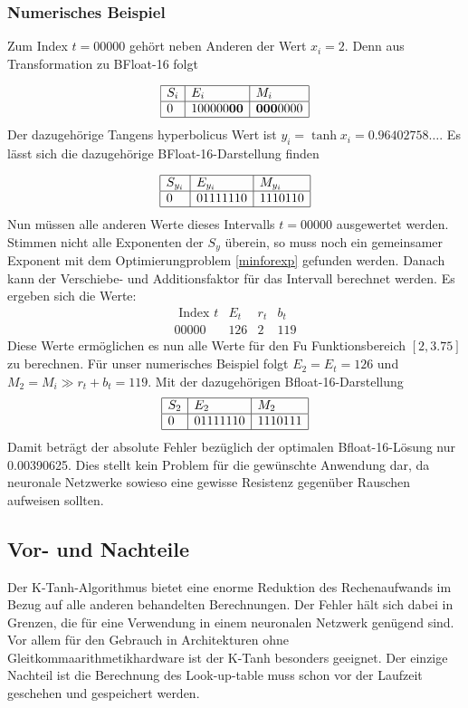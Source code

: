 \subsubsection{Numerisches Beispiel
	\label{transfer:subsection:Ktanh-Algorithmus:Num}}
Zum Index $t = 00000$ gehört neben Anderen der Wert $x_i = 2$. Denn aus Transformation zu BFloat-16 folgt

$$
\begin{array}{|l|l|l|}
	\hline S_i & E_{i} & M_{i} \\
	\hline 0 & 100000 \textbf{00} & \textbf{000} 0000 \\
	\hline
\end{array}
$$
Der dazugehörige Tangens hyperbolicus Wert ist
$y_i = \tanh{x_i}=0.96402758\ldots$. Es lässt sich die dazugehörige BFloat-16-Darstellung finden

$$
\begin{array}{|l|l|l|}
	\hline S_{y_{i}} & E_{y_{i}} & M_{y_{i}} \\
	\hline 0 & 01111110 & 1110110 \\
	\hline
\end{array}
$$
Nun müssen alle anderen Werte dieses Intervalls $t = 00000$ ausgewertet werden. Stimmen nicht alle Exponenten der $S_{y}$ überein, so muss noch ein gemeinsamer Exponent mit dem Optimierungproblem \ref{minforexp} gefunden werden. Danach kann der Verschiebe- und Additionsfaktor für das Intervall berechnet werden. 
Es ergeben sich die Werte:
$$
\begin{array}{c|ccc}
	\text { Index } t & E_{t} & r_{t} & b_{t} \\
	\hline 00000 & 126 & 2 & 119
\end{array}
$$
Diese Werte ermöglichen es nun alle Werte für den Fu Funktionsbereich $[2,3.75]$ zu berechnen. Für unser numerisches Beispiel folgt $E_2 = E_t = 126$ und $M_2 = M_i \gg r_t + b_t = 119$. Mit der dazugehörigen Bfloat-16-Darstellung
$$
\begin{array}{|l|l|l|}
	\hline S_{2} & E_{2} & M_{2} \\
	\hline 0 & 01111110 & 1110111 \\
	\hline
\end{array}
$$
Damit beträgt der absolute Fehler bezüglich der optimalen Bfloat-16-Lösung nur 0.00390625. Dies stellt kein Problem für die gewünschte Anwendung dar, da neuronale Netzwerke sowieso eine gewisse Resistenz gegenüber Rauschen aufweisen sollten.


\subsection{Vor- und Nachteile}
Der K-Tanh-Algorithmus bietet eine enorme Reduktion des Rechenaufwands im Bezug auf alle anderen behandelten Berechnungen. Der Fehler hält sich dabei in Grenzen, die für eine Verwendung in einem neuronalen Netzwerk genügend sind. Vor allem für den Gebrauch in Architekturen ohne Gleitkommaarithmetikhardware ist der K-Tanh besonders geeignet. Der einzige Nachteil ist die Berechnung des Look-up-table muss schon vor der Laufzeit geschehen und gespeichert werden.







